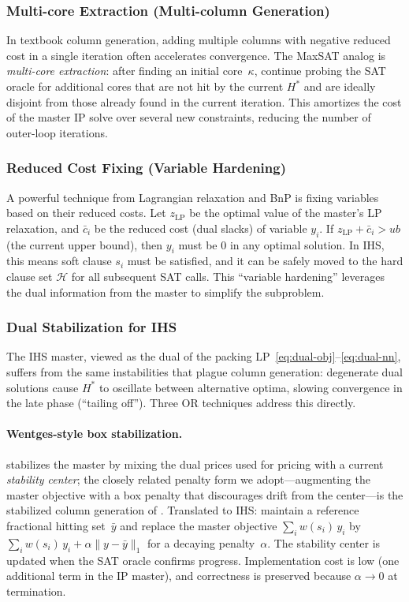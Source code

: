 \subsubsection{Multi-core Extraction (Multi-column Generation)}

In textbook column generation, adding multiple columns with negative reduced
cost in a single iteration often accelerates convergence. The MaxSAT analog
is \emph{multi-core extraction}: after finding an initial core~$\kappa$,
continue probing the SAT oracle for additional cores that are not hit by the
current $H^*$ and are ideally disjoint from those already found in the current
iteration. This amortizes the cost of the master IP solve over several new
constraints, reducing the number of outer-loop iterations.

\subsubsection{Reduced Cost Fixing (Variable Hardening)}

A powerful technique from Lagrangian relaxation and BnP is fixing variables
based on their reduced costs. Let $z_{\mathrm{LP}}$ be the optimal value of the
master's LP relaxation, and $\bar{c}_i$ be the reduced cost (dual slacks) of
variable $y_i$. If $z_{\mathrm{LP}} + \bar{c}_i > \mathit{ub}$ (the current
upper bound), then $y_i$ must be $0$ in any optimal solution. In IHS, this
means soft clause $s_i$ must be satisfied, and it can be safely moved to the
hard clause set $\mathcal{H}$ for all subsequent SAT calls. This
``variable hardening'' leverages the dual information from the master to
simplify the subproblem.

\subsubsection{Dual Stabilization for IHS}

The IHS master, viewed as the dual of the packing
LP~\eqref{eq:dual-obj}--\eqref{eq:dual-nn}, suffers from the same instabilities
that plague column generation: degenerate dual solutions cause $H^*$ to
oscillate between alternative optima, slowing convergence in the late phase
(``tailing off''). Three OR techniques address this directly.

\paragraph{Wentges-style box stabilization.}
\citet{wentges1997weighted} stabilizes the master by mixing the dual prices
used for pricing with a current \emph{stability center}; the closely related
penalty form we adopt---augmenting the master objective with a box penalty
that discourages drift from the center---is the stabilized column generation
of \citet{dumerle1999stabilized}. Translated to IHS: maintain a reference fractional hitting set~$\bar{y}$ and
replace the master objective $\sum_i w(s_i)\, y_i$ by
$\sum_i w(s_i)\, y_i + \alpha \|y - \bar{y}\|_1$ for a decaying
penalty~$\alpha$. The stability center is updated when the SAT oracle
confirms progress. Implementation cost is low (one additional term in the IP
master), and correctness is preserved because $\alpha \to 0$ at termination.

